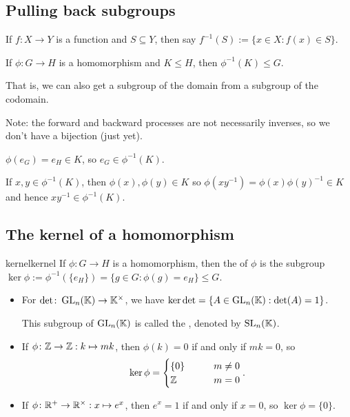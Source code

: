 \documentclass[12pt,letterpaper]{report}
\begin{document}
\pagebreak
\subsection{Pulling back subgroups}

If $f \colon X \to Y$ is a function and $S \subseteq Y$, then say
$f^{-1}(S) := \{x \in X : f(x) \in S\}$.

\begin{prop}{}{}
  If $\phi \colon G \to H$ is a homomorphism and $K \leq H$, then $\phi^{-1}(K) \leq G$.
\end{prop}

That is, we can also get a subgroup of the domain from a subgroup of the codomain.

Note: the forward and backward processes are not necessarily inverses, so we don't have a bijection
(just yet).

\begin{thmproof}
  $\phi(e_G) = e_H \in K$, so $e_G \in \phi^{-1}(K)$.

  If $x, y \in \phi^{-1}(K)$, then $\phi(x), \phi(y) \in K$ so
  $\phi(x y^{-1}) = \phi(x) \phi(y)^{-1} \in K$ and hence $xy^{-1} \in \phi^{-1}(K)$.
\end{thmproof}

\pagebreak
\subsection{The kernel of a homomorphism}

\begin{defn}{kernel}{kernel}
  If $\phi \colon G \to H$ is a homomorphism, then the  of $\phi$ is the subgroup
  $\ker \phi := \phi^{-1}(\{e_H\}) = \{ g \in G : \phi(g) = e_H \} \leq G$.
\end{defn}

\begin{ex}
  \begin{itemize}
    \item
    For $\det \colon \operatorname{GL}_n(\mathbb{K}) \to \mathbb{K}^\times$, we have
    $\ker \det = \{ A \in \operatorname{GL}_n(\mathbb{K}) : \det(A) = 1 \}$.

    This subgroup of $\operatorname{GL}_n(\mathbb{K})$ is called the , denoted by
    $\operatorname{SL}_n(\mathbb{K})$.
    \item
    If $\phi \colon \mathbb{Z} \to \mathbb{Z} : k \mapsto mk$, then $\phi(k) = 0$ if and only if
    $mk = 0$, so
    \[ \ker \phi = \begin{cases}
      \{0\} \qquad & m \neq 0 \\
      \mathbb{Z} & m = 0
    \end{cases}. \]
    \item
    If $\phi \colon \mathbb{R}^+ \to \mathbb{R}^\times : x \mapsto e^x$, then $e^x = 1$ if and only
    if $x = 0$, so $\ker \phi = \{0\}$.
  \end{itemize}
\end{ex}
\end{document}
